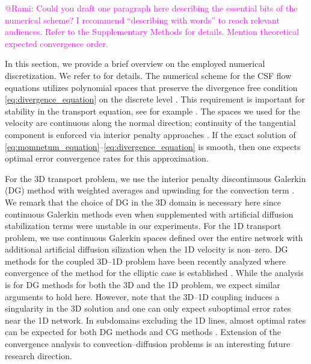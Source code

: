 \documentclass[fleqn,10pt]{wlscirep}
\newcommand{\mer}[1]{\textcolor{magenta}{#1}}
\begin{document}
\mer{@Rami: Could you draft one paragraph here describing the essential bits of the numerical scheme? I recommend ``describing with words'' to reach relevant audiences. Refer to the Supplementary Methods for details. Mention theoretical expected convergence order.} 

In this section, we provide a brief overview on the employed numerical discretization. We refer to  for details. The numerical scheme for the CSF flow equations utilizes polynomial spaces that preserve the divergence free condition \eqref{eq:divergence_equation} on the discrete level \cite{hong2016robust}. This requirement is important for stability in the transport equation, see for example \cite{cesmelioglu2022compatible}. The spaces we used for the velocity are continuous along the normal direction; continuity of the tangential component is enforced via interior penalty approaches \cite{hong2016robust}.  If the exact solution of \eqref{eq:momnetum_equation}--\eqref{eq:divergence_equation} is smooth, then one expects optimal error convergence rates for this approximation. 

For the 3D transport problem, we use the interior penalty discontinuous Galerkin (DG) method with weighted averages and upwinding for the convection term \cite{ern2009discontinuous}.  We remark that the choice of DG in the 3D domain is necessary here since  continuous Galerkin methods even when supplemented with artificial diffusion stabilization terms were unstable in our experiments. For the 1D transport problem, we use continuous Galerkin spaces defined over the entire network with additional artificial diffusion silization when the 1D velocity is non--zero.  DG methods for the coupled 3D--1D problem have been recently analyzed  where convergence of the method for the elliptic case is established \cite{masri2024discontinuous}. While the analysis is for DG methods for both the 3D and the 1D problem, we expect similar arguments to hold here. However, note that the 3D--1D coupling induces a singularity in the 3D solution and one can only expect suboptimal error rates near the 1D network. In subdomains excluding the 1D lines, almost optimal rates can be expected for both DG methods \cite{masri2023discontinuous} and CG methods \cite{koppl2016local}.  Extension of the convergence analysis to convection--diffusion problems is an interesting future research direction. 
 
\end{document}
